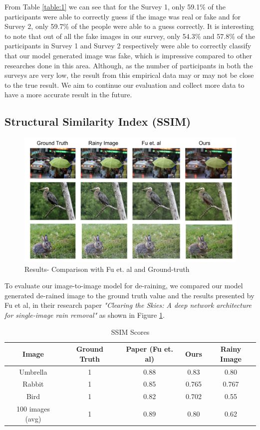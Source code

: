 \documentclass{article}
\begin{document}
From Table \ref{table:1} we can see that for the Survey 1, only 59.1\% of the participants were able to correctly guess if the image was real or fake and for Survey 2, only 59.7\% of the people were able to a guess correctly. It is interesting to note that out of all the fake images in our survey, only 54.3\% and 57.8\% of the participants in Survey 1 and  Survey 2 respectively were able to correctly classify that our model generated image was fake, which is impressive compared to other researches done in this area. Although, as the number of participants in both the surveys are very low, the result from this empirical data may or may not be close to the true result. We aim to continue our evaluation and collect more data to have a more accurate result in the future.

\subsection{Structural Similarity Index (SSIM)}


\begin{figure}[H]
	\centering
	\includegraphics[width=\linewidth]{images/ssim.png}
	\caption{Results- Comparison with Fu et. al and Ground-truth}
	\label{figure:2}
\end{figure}

To evaluate our image-to-image model for de-raining, we compared our model generated de-rained image to the ground truth value and the results presented by Fu et al, in their research paper \textit{"Clearing the Skies: A deep network architecture for single-image rain removal"} as shown in Figure \ref{figure:2}. 

\begin{table} [h!]
\centering
\begin{tabular}{ | c | c | c | c | c |}
\hline
 Image & Ground Truth & Paper (Fu et. al) & Ours & Rainy Image \\ 
\hline
 Umbrella & 1 & 0.88 & 0.83 & 0.80 \\
 Rabbit & 1 & 0.85 & 0.765 & 0.767 \\
 Bird & 1 & 0.82 & 0.702 & 0.55 \\
 100 images (avg) & 1 & 0.89 & 0.80 & 0.62 \\
 \hline
\end{tabular}
\caption{SSIM Scores}
\label{table:2}
\end{table}
\end{document}

